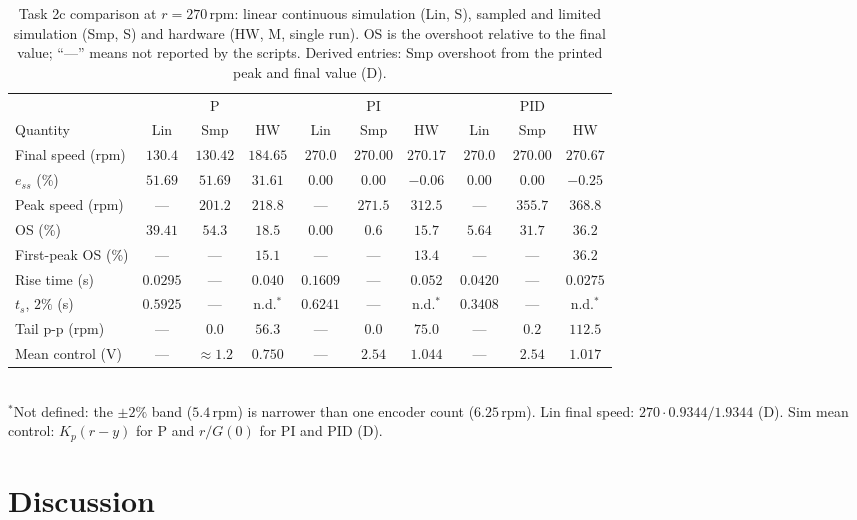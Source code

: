 \documentclass[lettersize,journal]{IEEEtran}
\newcommand{\rpm}{\,\text{rpm}}
\begin{document}
\begin{table}[!t]
\centering
\caption{Task 2c comparison at $r=270\rpm$: linear continuous simulation (Lin, S), sampled and limited simulation (Smp, S) and hardware (HW, M, single run). OS is the overshoot relative to the final value; ``---'' means not reported by the scripts. Derived entries: Smp overshoot from the printed peak and final value (D).}
\label{tab:cmp}
\scriptsize
\setlength{\tabcolsep}{3pt}
\begin{tabular}{@{}lccccccccc@{}}
\toprule
 & \multicolumn{3}{c}{P} & \multicolumn{3}{c}{PI} & \multicolumn{3}{c}{PID} \\
\cmidrule(lr){2-4}\cmidrule(lr){5-7}\cmidrule(lr){8-10}
Quantity & Lin & Smp & HW & Lin & Smp & HW & Lin & Smp & HW \\
\midrule
Final speed (rpm) & $130.4$ & $130.42$ & $184.65$ & $270.0$ & $270.00$ & $270.17$ & $270.0$ & $270.00$ & $270.67$ \\
$e_{ss}$ (\%) & $51.69$ & $51.69$ & $31.61$ & $0.00$ & $0.00$ & $-0.06$ & $0.00$ & $0.00$ & $-0.25$ \\
Peak speed (rpm) & --- & $201.2$ & $218.8$ & --- & $271.5$ & $312.5$ & --- & $355.7$ & $368.8$ \\
OS (\%) & $39.41$ & $54.3$ & $18.5$ & $0.00$ & $0.6$ & $15.7$ & $5.64$ & $31.7$ & $36.2$ \\
First-peak OS (\%) & --- & --- & $15.1$ & --- & --- & $13.4$ & --- & --- & $36.2$ \\
Rise time (s) & $0.0295$ & --- & $0.040$ & $0.1609$ & --- & $0.052$ & $0.0420$ & --- & $0.0275$ \\
$t_s$, $2\%$ (s) & $0.5925$ & --- & n.d.$^{\ast}$ & $0.6241$ & --- & n.d.$^{\ast}$ & $0.3408$ & --- & n.d.$^{\ast}$ \\
Tail p-p (rpm) & --- & $0.0$ & $56.3$ & --- & $0.0$ & $75.0$ & --- & $0.2$ & $112.5$ \\
Mean control (V) & --- & $\approx1.2$ & $0.750$ & --- & $2.54$ & $1.044$ & --- & $2.54$ & $1.017$ \\
\bottomrule
\end{tabular}\\[3pt]
{\scriptsize $^{\ast}$Not defined: the $\pm2\%$ band ($5.4\rpm$) is narrower than one encoder count ($6.25\rpm$). Lin final speed: $270\cdot0.9344/1.9344$ (D). Sim mean control: $K_p(r-y)$ for P and $r/G(0)$ for PI and PID (D).}
\end{table}

\section{Discussion}
\end{document}
